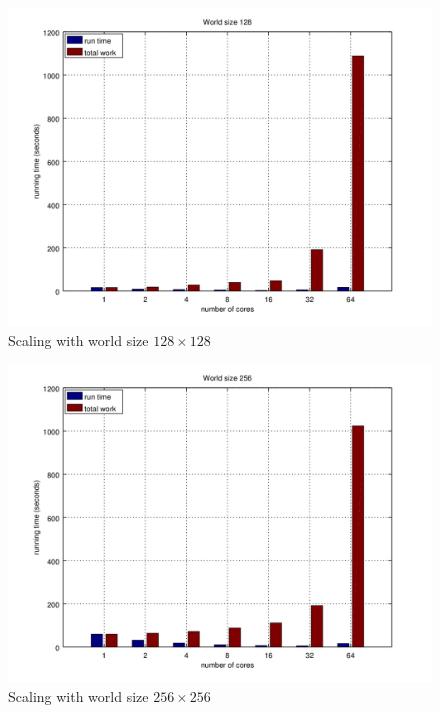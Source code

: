 \documentclass[a4paper]{article}
\begin{document}
\begin{figure}
    \centering
    \includegraphics[width=\textwidth]{scaling-128}
    \caption{Scaling with world size $128 \times 128$}
\end{figure}

\begin{figure}
    \centering
    \includegraphics[width=\textwidth]{scaling-256}
    \caption{Scaling with world size $256 \times 256$}
\end{figure}
\end{document}
